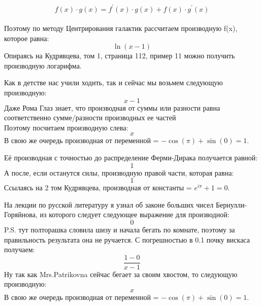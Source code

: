\documentclass[a4paper,12pt]{article}
\begin{document}
  \begin{equation}
  f(x) \cdot g(x) = f^{'}(x) \cdot g(x) + f(x) \cdot g^{'}(x)
 \end{equation} \\Поэтому по методу Центрирования галактик рассчитаем производную f(x), которое равна: 
\begin{equation}
\ln(x-1) 
\end{equation} 
Опираясь на Кудрявцева, том 1, страница 112, пример 11 можно получить производную логарифма.

Как в детстве нас учили ходить, так и сейчас мы возьмем следующую производную:
\begin{equation}
x-1
\end{equation} 
Даже Рома Глаз знает, что производная от суммы или разности равна соответственно сумме/разности производных ее частей\\Поэтому посчитаем производную слева: 
\begin{equation}
x
\end{equation} 
В свою же очередь производная от переменной = $- \cos(\pi) + \sin(0) = 1$.

Её производная с точностью до распределение Ферми-Дирака получается равной:
\begin{equation}
1
\end{equation} 
А после, если останутся силы, производную правой части, которая равна: 
\begin{equation}
1
\end{equation} 
Ссылаясь на 2 том Кудрявцева, производная от константы = $e^{i\pi} + 1 = 0$.

На лекции по русской литературу я узнал об законе больших чисел Бернулли-Горяйнова, из которого следует следующее выражение для производной:
\begin{equation}
0
\end{equation} 
 P.S. тут полторашка словила шизу и начала бегать по комнате, поэтому за правильность результата она не ручается. С погрешностью в 0.1 почку вискаса получаем:
\begin{equation}
\frac{1-0}{x-1} 
\end{equation} 
Ну так как Mrs.Patrikovna сейчас бегает за своим хвостом, то следующую производную: 
\begin{equation}
x
\end{equation} 
В свою же очередь производная от переменной = $- \cos(\pi) + \sin(0) = 1$.
\end{document}
